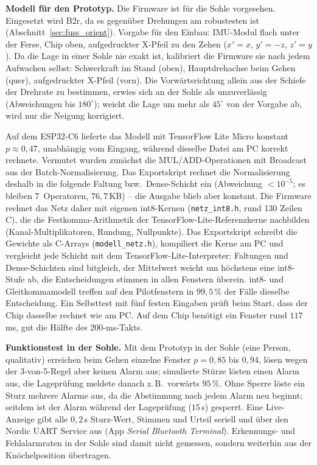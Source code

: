 \documentclass[11pt,a4paper,oneside]{report}
\begin{document}
\textbf{Modell für den Prototyp.} Die Firmware ist für die Sohle
vorgesehen. Eingesetzt wird B2r, da es gegenüber Drehungen am
robustesten ist (Abschnitt~\ref{sec:fuss_orient}). Vorgabe für den
Einbau: IMU-Modul flach unter der Ferse, Chip oben, aufgedruckter
X-Pfeil zu den Zehen ($x' = x$, $y' = -z$, $z' = y$). Da die Lage in
einer Sohle nie exakt ist, kalibriert die Firmware sie nach jedem
Aufwachen selbst: Schwerkraft im Stand (oben), Hauptdrehachse beim
Gehen (quer), aufgedruckter X-Pfeil (vorn). Die Vorwärtsrichtung allein
aus der Schiefe der Drehrate zu bestimmen, erwies sich an der Sohle als
unzuverlässig (Abweichungen bis $180^{\circ}$); weicht die Lage um mehr
als $45^{\circ}$ von der Vorgabe ab, wird nur die Neigung korrigiert.

Auf dem ESP32-C6 lieferte das Modell mit TensorFlow Lite Micro konstant
$p \approx 0{,}47$, unabhängig vom Eingang, während dieselbe Datei am
PC korrekt rechnete. Vermutet wurden zunächst die MUL/ADD-Operationen
mit Broadcast aus der Batch-Normalisierung. Das Exportskript rechnet die
Normalisierung deshalb in die folgende Faltung bzw.\ Dense-Schicht ein
(Abweichung $< 10^{-5}$; es bleiben 7~Operatoren, $76{,}7$\,KB) -- die
Ausgabe blieb aber konstant. Die Firmware rechnet das Netz daher mit
eigenen int8-Kernen (\texttt{netz\_int8.h}, rund 130 Zeilen C), die die
Festkomma-Arithmetik der TensorFlow-Lite-Referenzkerne nachbilden
(Kanal-Multiplikatoren, Rundung, Nullpunkte). Das Exportskript schreibt
die Gewichte als C-Arrays (\texttt{modell\_netz.h}), kompiliert die
Kerne am PC und vergleicht jede Schicht mit dem TensorFlow-Lite-Interpreter:
Faltungen und Dense-Schichten sind bitgleich, der Mittelwert weicht um
höchstens eine int8-Stufe ab, die Entscheidungen stimmen in allen
Fenstern überein. int8- und Gleitkommamodell treffen auf den
Pilotfenstern in $99{,}5\,\%$ der Fälle dieselbe Entscheidung. Ein
Selbsttest mit fünf festen Eingaben prüft beim Start, dass der Chip
dasselbe rechnet wie am PC. Auf dem Chip benötigt ein Fenster rund
$117$\,ms, gut die Hälfte des $200$-ms-Takts.

\textbf{Funktionstest in der Sohle.} Mit dem Prototyp in der Sohle
(eine Person, qualitativ) erreichen beim Gehen einzelne Fenster
$p = 0{,}85$ bis $0{,}94$, lösen wegen der 3-von-5-Regel aber keinen
Alarm aus; simulierte Stürze lösten einen Alarm aus, die Lageprüfung
meldete danach z.\,B.\ \glqq vorwärts $95\,\%$\grqq. Ohne Sperre löste ein
Sturz mehrere Alarme aus, da die Abstimmung nach jedem Alarm neu
beginnt; seitdem ist der Alarm während der Lageprüfung ($15$\,s)
gesperrt. Eine Live-Anzeige gibt alle $0{,}2$\,s Sturz-Wert, Stimmen
und Urteil seriell und über den Nordic UART Service aus (App
\emph{Serial Bluetooth Terminal}). Erkennungs- und Fehlalarmraten in
der Sohle sind damit nicht gemessen, sondern weiterhin aus der
Knöchelposition übertragen.
\end{document}

